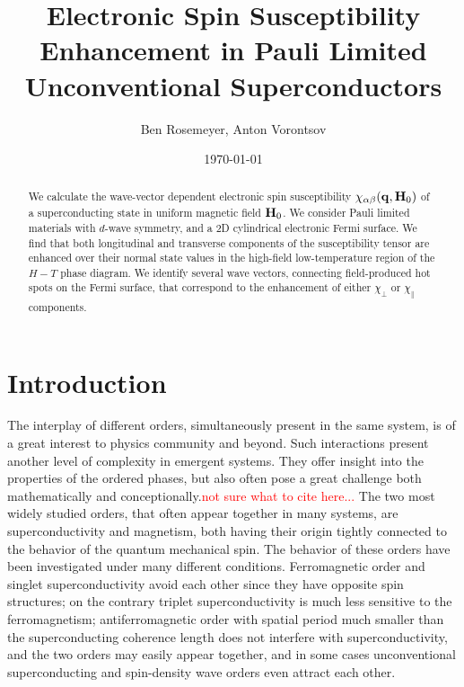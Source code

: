 \documentclass[prb,showpacs,amssymb,amsmath,twocolumn]{revtex4-1}
\newcommand{\red}{\textcolor{red}}
\begin{document}
\title{Electronic Spin Susceptibility Enhancement in Pauli Limited Unconventional Superconductors}

\author{Ben Rosemeyer, Anton Vorontsov}


\date{\today}

\begin{abstract}
%
We calculate the wave-vector dependent electronic spin susceptibility 
$\chi_{\alpha\beta}({\bf q}, {\bf H}_0)$ 
of a superconducting state in uniform magnetic field ${\bf H}_0$. 
We consider Pauli limited materials with $d$-wave symmetry, and a 2D cylindrical 
electronic Fermi surface.  
We find that both longitudinal and transverse components of the susceptibility tensor are enhanced over their
normal state values in the high-field low-temperature region of the $H-T$
phase diagram. We identify several wave vectors, connecting field-produced hot spots on the Fermi surface, 
that correspond to the enhancement of either $\chi_\perp$ or $\chi_\parallel$ components. 
%
\end{abstract} 

\pacs{74.20.Rp,74.25.Dw, \red{MORE?,DIFFERENT?} }



\maketitle



\section{Introduction}
%
The interplay of different orders, simultaneously present in the same system, 
is of a great interest to physics community and beyond. 
Such interactions present another level of complexity in emergent systems. 
They offer insight into the properties of the ordered phases, but also 
often pose a great challenge both mathematically 
and conceptionally.\cite{x}\red{not sure what to cite here...} 
The two most widely studied orders, that often appear together in many systems, 
are superconductivity and magnetism, both having their origin tightly 
connected to the behavior of the quantum mechanical spin. 
The behavior of these orders have been investigated under many different conditions. 
Ferromagnetic order and singlet superconductivity avoid each other since they have opposite spin 
structures\cite{x}; 
on the contrary triplet superconductivity is much less sensitive to the ferromagnetism\cite{x}; 
antiferromagnetic order with spatial period much smaller than the superconducting coherence length 
does not interfere with superconductivity, and the two orders may easily appear together\cite{x},  
and in some cases unconventional superconducting and spin-density wave orders even attract each other\cite{x}. 
\end{document}
